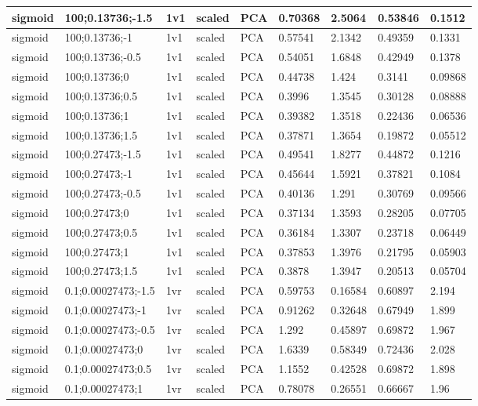 \begin{longtable}{lllllllll}
sigmoid & 100;0.13736;-1.5 & 1v1 & scaled & PCA & 0.70368 & 2.5064 & 0.53846 & 0.1512\\ \hline
sigmoid & 100;0.13736;-1 & 1v1 & scaled & PCA & 0.57541 & 2.1342 & 0.49359 & 0.1331\\ \hline
sigmoid & 100;0.13736;-0.5 & 1v1 & scaled & PCA & 0.54051 & 1.6848 & 0.42949 & 0.1378\\ \hline
sigmoid & 100;0.13736;0 & 1v1 & scaled & PCA & 0.44738 & 1.424 & 0.3141 & 0.09868\\ \hline
sigmoid & 100;0.13736;0.5 & 1v1 & scaled & PCA & 0.3996 & 1.3545 & 0.30128 & 0.08888\\ \hline
sigmoid & 100;0.13736;1 & 1v1 & scaled & PCA & 0.39382 & 1.3518 & 0.22436 & 0.06536\\ \hline
sigmoid & 100;0.13736;1.5 & 1v1 & scaled & PCA & 0.37871 & 1.3654 & 0.19872 & 0.05512\\ \hline
sigmoid & 100;0.27473;-1.5 & 1v1 & scaled & PCA & 0.49541 & 1.8277 & 0.44872 & 0.1216\\ \hline
sigmoid & 100;0.27473;-1 & 1v1 & scaled & PCA & 0.45644 & 1.5921 & 0.37821 & 0.1084\\ \hline
sigmoid & 100;0.27473;-0.5 & 1v1 & scaled & PCA & 0.40136 & 1.291 & 0.30769 & 0.09566\\ \hline
sigmoid & 100;0.27473;0 & 1v1 & scaled & PCA & 0.37134 & 1.3593 & 0.28205 & 0.07705\\ \hline
sigmoid & 100;0.27473;0.5 & 1v1 & scaled & PCA & 0.36184 & 1.3307 & 0.23718 & 0.06449\\ \hline
sigmoid & 100;0.27473;1 & 1v1 & scaled & PCA & 0.37853 & 1.3976 & 0.21795 & 0.05903\\ \hline
sigmoid & 100;0.27473;1.5 & 1v1 & scaled & PCA & 0.3878 & 1.3947 & 0.20513 & 0.05704\\ \hline
sigmoid & 0.1;0.00027473;-1.5 & 1vr & scaled & PCA & 0.59753 & 0.16584 & 0.60897 & 2.194\\ \hline
sigmoid & 0.1;0.00027473;-1 & 1vr & scaled & PCA & 0.91262 & 0.32648 & 0.67949 & 1.899\\ \hline
sigmoid & 0.1;0.00027473;-0.5 & 1vr & scaled & PCA & 1.292 & 0.45897 & 0.69872 & 1.967\\ \hline
sigmoid & 0.1;0.00027473;0 & 1vr & scaled & PCA & 1.6339 & 0.58349 & 0.72436 & 2.028\\ \hline
sigmoid & 0.1;0.00027473;0.5 & 1vr & scaled & PCA & 1.1552 & 0.42528 & 0.69872 & 1.898\\ \hline
sigmoid & 0.1;0.00027473;1 & 1vr & scaled & PCA & 0.78078 & 0.26551 & 0.66667 & 1.96\\ \hline

\end{longtable}
